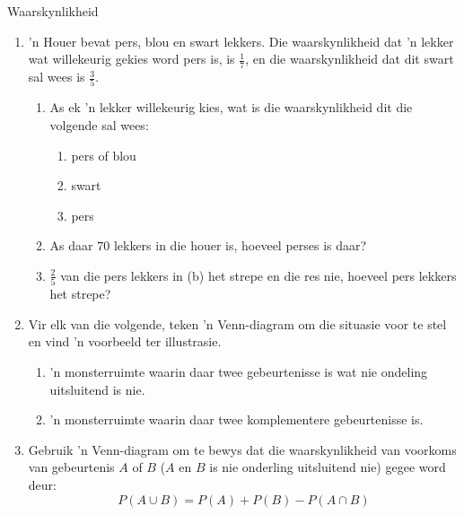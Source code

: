 \begin{eocexercises}{Waarskynlikheid}
\begin{enumerate}[itemsep=5pt, label=\textbf{\arabic*}.]
\begin{enumerate}[noitemsep, label=\textbf{(\alph*)} ]
    \item Wat is die waarskynlikheid dat 'n kind wat willekeurig gekies word die volgende het:
      \begin{enumerate}[noitemsep, label=\roman*. ]
      \item bruin o\"e
      \item rooi hare
      \end{enumerate} 
    \item 'n Kind met bruin\"e word willekeurig gekies. Wat is die waarskynlikheid dat hierdie kind rooi hare het?
    \end{enumerate}
  \item 'n Houer bevat pers, blou en swart lekkers. Die waarskynlikheid dat 'n lekker wat willekeurig gekies word pers is, is $\frac{1}{7}$, en die waarskynlikheid dat dit swart sal wees is $\frac{3}{5}$.
    \begin{enumerate}[noitemsep, label=\textbf{(\alph*)} ]
    \item As ek 'n lekker willekeurig kies, wat is die waarskynlikheid dit die volgende sal wees:
      \begin{enumerate}[noitemsep, label=\roman*. ]
      \item pers of blou
      \item swart
      \item pers
      \end{enumerate}
    \item As daar $70$ lekkers in die houer is, hoeveel perses is daar?
    \item $\frac{2}{5}$ van die pers lekkers in (b) het strepe en die res nie, hoeveel pers lekkers het strepe?
    \end{enumerate}
  \item Vir elk van die volgende, teken 'n Venn-diagram om die situasie voor te stel en vind 'n voorbeeld ter illustrasie.
    \begin{enumerate}[noitemsep, label=\textbf{(\alph*)} ]
    \item 'n monsterruimte waarin daar twee gebeurtenisse is wat nie ondeling uitsluitend is nie.
    \item 'n monsterruimte waarin daar twee komplementere gebeurtenisse is.
    \end{enumerate}
  \item Gebruik 'n Venn-diagram om te bewys dat die waarskynlikheid van voorkoms van gebeurtenis  $A$ of $B$ ($A$ en $B$ is nie onderling uitsluitend nie) gegee word deur:
    \[P(A \cup B) = P(A) + P(B) - P(A \cap B)\]

\end{enumerate}
\end{eocexercises}
